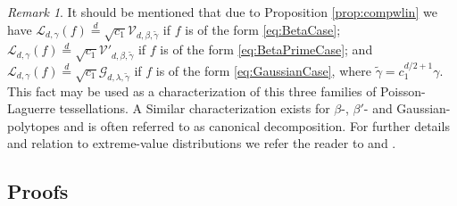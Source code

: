 \documentclass[11pt,a4paper]{article}
\theoremstyle{plain}
\theoremstyle{definition}
\theoremstyle{remark}
\newtheorem{remark}[theorem]{Remark}
\def\cG{\mathcal{G}}
\def\cL{\mathcal{L}}
\def\cV{\mathcal{V}}
\begin{document}
\begin{remark}
    It should be mentioned that due to Proposition \ref{prop:compwlin} we have $\cL_{d,\gamma}(f)\overset{d}{=}\sqrt{c_1}\cV_{d,\beta,\widetilde\gamma}$ if $f$ is of the form \eqref{eq:BetaCase}; $\cL_{d,\gamma}(f)\overset{d}{=}\sqrt{c_1}\cV'_{d,\beta,\widetilde\gamma}$ if $f$ is of the form \eqref{eq:BetaPrimeCase}; and $\cL_{d,\gamma}(f)\overset{d}{=}\sqrt{c_1}\cG_{d,\lambda,\widetilde\gamma}$ if $f$ is of the form \eqref{eq:GaussianCase}, where $\widetilde\gamma=c_1^{d/2+1}\gamma$. This fact may be used as a characterization of this three families of Poisson-Laguerre tessellations. A Similar characterization exists for $\beta$-, $\beta'$- and Gaussian-polytopes and is often referred to as canonical decomposition. For further details and relation to extreme-value distributions we refer the reader to \cite[Section 12]{Miles_IRS} and \cite[Section 3]{KZT20}.
\end{remark}

\subsection{Proofs}
\end{document}
